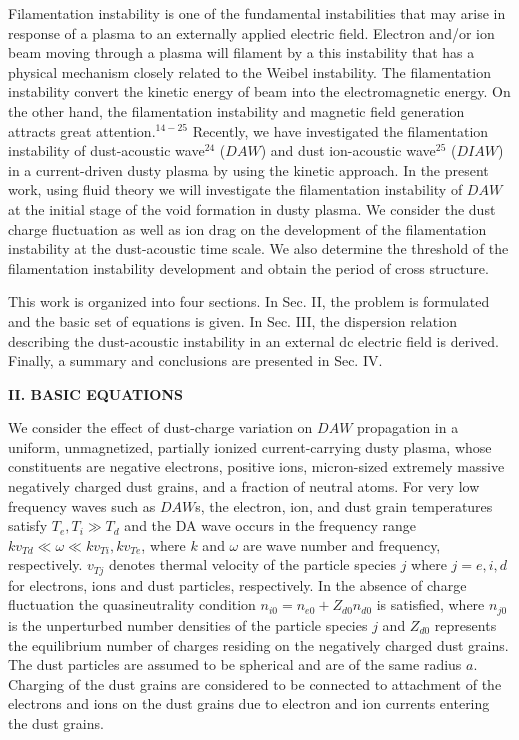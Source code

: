 Filamentation instability is one of the fundamental instabilities
that may arise in response of a plasma to an externally applied
electric field. Electron and/or ion beam moving through a plasma
will filament by a this instability that has a physical mechanism
closely related to the Weibel instability. The filamentation
instability convert the kinetic energy of  beam into the
electromagnetic energy. On the other hand, the filamentation
instability and magnetic field generation attracts great
attention.$^{14-25}$ Recently, we have investigated the
filamentation instability of dust-acoustic wave$^{24}$ ($DAW$) and
dust ion-acoustic wave$^{25}$ ($DIAW$) in a current-driven dusty
plasma by using the kinetic approach. In the present work, using
fluid theory we will investigate the filamentation instability of
$DAW$ at the initial stage of the void formation in dusty plasma. We
consider the dust charge fluctuation as well as ion drag on the
development of the filamentation instability at the dust-acoustic
time scale. We also determine the threshold of the filamentation
instability development and obtain the period of cross structure.

This work is organized into four sections. In Sec. II, the problem
is formulated and the basic set of equations is given.  In Sec. III,
the dispersion relation describing the dust-acoustic instability in
an external dc electric field is derived. Finally, a summary and
conclusions are presented in Sec. IV.


\vskip 1cm {\bf\large II. BASIC EQUATIONS }\vskip 0.5cm

We consider the effect of dust-charge variation on $DAW$ propagation
in a uniform, unmagnetized, partially ionized current-carrying dusty
plasma, whose constituents are negative electrons, positive ions,
micron-sized extremely massive negatively charged dust grains, and a
fraction of neutral atoms. For very low frequency waves such as
$DAW$s, the electron, ion, and dust grain temperatures satisfy $
T_{e}, T_{i} \gg T_{d}$ and the DA wave occurs in the frequency
range $kv_{Td} \ll \omega \ll kv_{Ti}, kv_{Te}$, where $k$ and
$\omega$ are wave number and frequency, respectively. $v_{Tj}$
denotes thermal velocity of the particle species $j$ where $j=e, i,
d$ for electrons, ions and dust particles, respectively. In the
absence of charge fluctuation the quasineutrality condition
$n_{i0}=n_{e0}+Z_{d0}n_{d0}$ is satisfied, where $n_{j0}$ is the
unperturbed number densities of the particle species $j$ and
$Z_{d0}$ represents the equilibrium number of charges residing on
the negatively charged dust grains. The dust particles are assumed
to be spherical and are of the same radius $a$. Charging of the dust
grains are considered to be connected to attachment of the electrons
and ions on the dust grains due to electron and ion currents
entering the dust grains.


